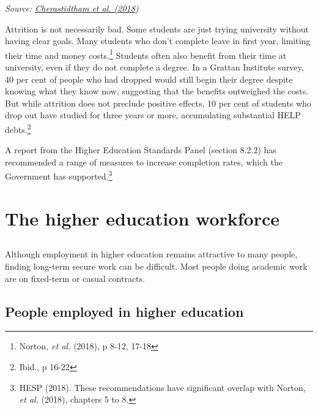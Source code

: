 \documentclass[]{book}
\begin{document}
\emph{Source: \protect\hyperlink{_ENREF_42}{Cherastidtham et al. (2018})}

Attrition is not necessarily bad. Some students are just trying university without having clear goals. Many students who don't complete leave in first year, limiting their time and money costs.\footnote{Norton\emph{, et al.} (2018), p 8-12, 17-18} Students often also benefit from their time at university, even if they do not complete a degree. In a Grattan Institute survey, 40 per cent of people who had dropped would still begin their degree despite knowing what they know now, suggesting that the benefits outweighed the costs. But while attrition does not preclude positive effects, 10 per cent of students who drop out have studied for three years or more, accumulating substantial HELP debts.\footnote{Ibid., p 16-22}

A report from the Higher Education Standards Panel (section 8.2.2) has recommended a range of measures to increase completion rates, which the Government has supported.\footnote{HESP (2018). These recommendations have significant overlap with Norton\emph{, et al.} (2018), chapters 5 to 8.}

\hypertarget{section-5}{%
\chapter{}\label{section-5}}

\hypertarget{the-higher-education-workforce}{%
\chapter{The higher education workforce}\label{the-higher-education-workforce}}

\hypertarget{section-6}{%
\section{}\label{section-6}}

Although employment in higher education remains attractive to many people, finding long-term secure work can be difficult. Most people doing academic work are on fixed-term or casual contracts.

\hypertarget{people-employed-in-higher-education}{%
\section{People employed in higher education }\label{people-employed-in-higher-education}}
\end{document}
